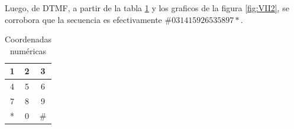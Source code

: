 \documentclass[letterpaper,onecolumn,10pt,journal,final]{IEEEtran}
\begin{document}
\begin{enumerate}[1)]
\begin{table}[H]
    \end{table}
    Luego, de DTMF, a partir de la tabla \ref{tab:phone} y los graficos de la figura \ref{fig:VII2}, se corrobora que la secuencia es efectivamente $\#031415926535897*$.
    \begin{table}[H]
        \centering
        \begin{tabular}{|c|c|c|}
        \hline
        1 & 2 & 3 \\\hline
        4 & 5 & 6 \\\hline
        7 & 8 & 9 \\\hline
        * & 0 & \# \\
        \hline
        \end{tabular}
        \caption{Coordenadas numéricas}
        \label{tab:phone}
    \end{table}
\end{enumerate}
\end{document}
